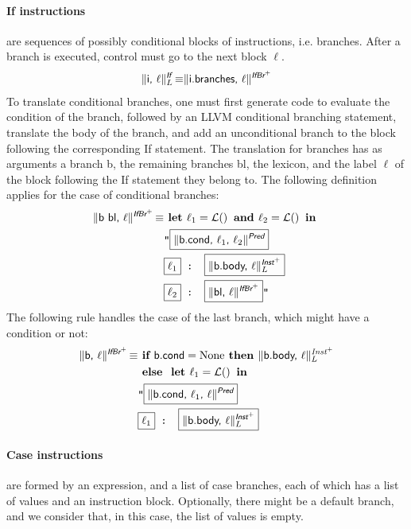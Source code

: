 \documentclass{llncs}
\newcommand{\trad}[2]{\ensuremath{\lVert \textsf{#1} \rVert^{\textit{#2}}}}
\DeclareMathOperator{\isdef}{\equiv}
\DeclareMathOperator{\lbl}{\mathcal{L}()}
\newcommand{\llvm}[1]{\texttt{#1}}
\newcommand{\B}[1]{\textsf{#1}}
\newcommand{\ListOf}[1]{$\mbox{#1}^+$}
\newcommand{\IF}[0]{\textbf{ if }}
\newcommand{\ELSE}[0]{\textbf{ else }}
\newcommand{\THEN}[0]{\textbf{ then }}
\newcommand{\LET}[0]{\textbf{ let }}
\newcommand{\IN}[0]{\textbf{ in }}
\newcommand{\AND}[0]{\textbf{ and }}
\newcommand{\PH}[1]{\framebox{$#1$}}
\begin{document}
\begin{enumerate}
\paragraph{If instructions} are sequences of possibly conditional blocks of
instructions, i.e. branches. After a branch is executed, control must go
to the next block $\ell$.
\begin{align*}
  \trad{i, $\ell$}{\B{If}}_L \isdef \trad{i.branches, $\ell$}{\ListOf{\B{IfBr}}}
\end{align*}
To translate conditional branches, one must first generate code to evaluate the
condition of the branch, followed by an LLVM conditional branching statement,
translate the body of the branch, and add an unconditional branch to the block
following the corresponding \B{If} statement.  The translation for branches has
as arguments a branch \B{b}, the remaining branches \B{bl}, the lexicon, and the
label $\ell$ of the block following the \B{If} statement they belong to. The
following definition applies for the case of conditional branches:
\begin{align*}
\begin{split}
  \trad{\B{b bl}, $\ell$}{\ListOf{\B{IfBr}}} \isdef & \LET \ell_1 = \lbl \AND \ell_2 = \lbl \IN \\
  & \llvm{"\PH{\trad{b.cond, $\ell_1$, $\ell_2$}{\B{Pred}}} } \\
  & \llvm{\PH{\ell_1} : \PH{\trad{b.body, $\ell$}{\ListOf{\B{Inst}}}_L}} \\
  & \llvm{\PH{\ell_2} : \PH{\trad{bl, $\ell$}{\ListOf{\B{IfBr}}}}"} \\
\end{split}
\end{align*}
The following rule handles the case of the last branch, which might have a condition or not:
\begin{align*}
\begin{split}
  \trad{\B{b}, $\ell$}{\ListOf{\B{IfBr}}} \isdef & \IF \B{b.cond} = \text{None} \THEN
  \trad{b.body, $\ell$}{\ListOf{Inst}}_L\\
  & \ELSE \LET \ell_1 = \lbl \IN \\
  & \llvm{"\PH{\trad{b.cond, $\ell_1$, $\ell$}{\B{Pred}}} } \\
  & \llvm{\PH{\ell_1} : \PH{\trad{b.body, $\ell$}{\ListOf{\B{Inst}}}_L}}
\end{split}
\end{align*}

\paragraph{Case instructions} are formed by an expression, and a list of case
branches, each of which has a list of values and an instruction block.
Optionally, there might be a default branch, and we consider that, in this case,
the list of values is empty. 


\end{enumerate}
\end{document}
